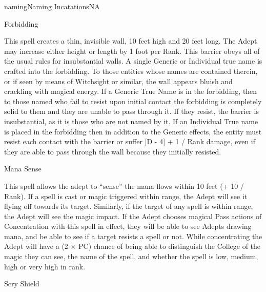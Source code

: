 \begin{College}[2.0]{naming}{Naming Incatations}{NA}
\begin{spell}[S-6]{Forbidding}
\begin{effects}
This spell creates a thin, invisible wall, 10 feet high and 20 feet
long. The Adept may increase either height or length by 1 foot per
Rank.  This barrier obeys all of the usual rules for insubstantial
walls.  A single Generic or Individual true name is crafted into the
forbidding. To those entities whose names are contained therein, or if
seen by means of Witchsight or similar, the wall appears bluish and
crackling with magical energy.  If a Generic True Name is in the
forbidding, then to those named who fail to resist upon initial
contact the forbidding is completely solid to them and they are unable
to pass through it.  If they resist, the barrier is insubstantial, as
it is those who are not named by it. If an Individual True name is
placed in the forbidding then in addition to the Generic effects, the
entity must resist each contact with the barrier or suffer [D - 4] + 1
/ Rank damage, even if they are able to pass through the wall because
they initially resisted.
\end{effects}
\end{spell}

\begin{spell}[S-7]{Mana Sense}

\begin{effects}
This spell allows the adept to “sense” the mana flows within 10 feet
(+ 10 / Rank). If a spell is cast or magic triggered within range, the
Adept will see it flying off towards its target. Similarly, if the
target of any spell is within range, the Adept will see the magic
impact.  If the Adept chooses magical Pass actions of Concentration
with this spell in effect, they will be able to see Adepts drawing
mana, and be able to see if a target resists a spell or not.  While
concentrating the Adept will have a (2 × PC) chance of being able to
distinguish the College of the magic they can see, the name of the
spell, and whether the spell is low, medium, high or very high in
rank.
\end{effects}
\end{spell}

\begin{spell}[S-8]{Scry Shield}


\end{spell}
\end{College}

